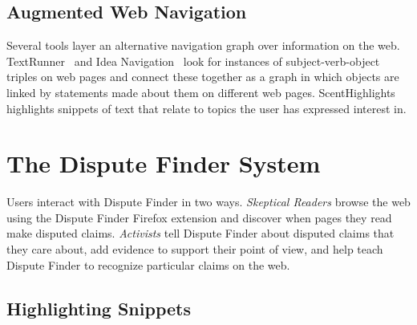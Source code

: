 \documentclass{www2010-submission}
\begin{document}
\subsection{Augmented Web Navigation}

Several tools layer an alternative navigation graph over information on the web. TextRunner~\cite{Etzioni2008} and Idea Navigation~\cite{Etzioni2008} look for instances of subject-verb-object triples on web pages and connect these together as a graph in which objects are linked by statements made about them on different web pages. ScentHighlights~\cite{Chi2005a} highlights snippets of text that relate to topics the user has expressed interest in. 



% 

% 



\section{The Dispute Finder System}

Users interact with Dispute Finder in two ways. {\it Skeptical Readers} browse the web using the Dispute Finder Firefox extension and discover when pages they read make disputed claims. {\it Activists} tell Dispute Finder about disputed claims that they care about, add evidence to support their point of view, and help teach Dispute Finder to recognize particular claims on the web.


\subsection{Highlighting Snippets}
\end{document}
